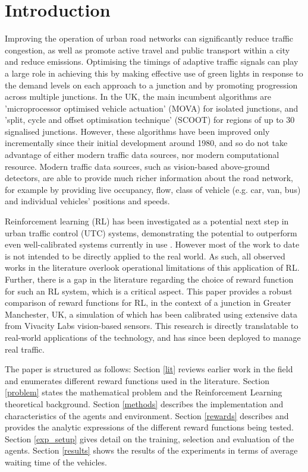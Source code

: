 \documentclass[conference]{IEEEtran}
\begin{document}
\section{Introduction}
Improving the operation of urban road networks can significantly reduce traffic congestion, as well as promote active travel and public transport within a city and reduce emissions.
Optimising the timings of adaptive traffic signals can play a large role in achieving this by making effective use of green lights in response to the demand levels on each approach to a junction and by promoting progression across multiple junctions.
In the UK, the main incumbent algorithms are 'microprocessor optimised vehicle actuation' (MOVA) for isolated junctions, and 'split, cycle and offset optimisation technique' (SCOOT) for regions of  up to 30 signalised junctions.
However, these algorithms have been improved only incrementally since their initial development around 1980, and so do not take advantage of either modern traffic data sources, nor modern computational resource. Modern traffic data sources, such as vision-based above-ground detectors, are able to provide much richer information about the road network, for example by providing live occupancy, flow, class of vehicle (e.g. car, van, bus) and individual vehicles' positions and speeds.

Reinforcement learning (RL) has been investigated as a potential next step in urban traffic control (UTC) systems, demonstrating the potential to outperform even well-calibrated systems currently in use \cite{wei2019a}.
However most of the work to date is not intended to be directly applied to the real world. As such, all observed works in the literature overlook operational limitations of this application of RL.
Further, there is a gap in the literature regarding the choice of reward function for such an RL system, which is a critical aspect.
This paper provides a robust comparison of reward functions for RL, in the context of a junction in Greater Manchester, UK, a simulation of which has been calibrated using extensive data from Vivacity Labs vision-based sensors.
This research is directly translatable to real-world applications of the technology, and has since been deployed to manage real traffic. 

The paper is structured as follows: Section \ref{lit} reviews earlier work in the field and enumerates different reward functions used in the literature.
Section \ref{problem} states the mathematical problem and the Reinforcement Learning theoretical background.
Section \ref{methods} describes the implementation and characteristics of the agents and environment.
Section \ref{rewards} describes and provides the analytic expressions of the different reward functions being tested.
Section \ref{exp_setup} gives detail on the training, selection and evaluation of the agents.
Section \ref{results} shows the results of the experiments in terms of average waiting time of the vehicles.
\end{document}
